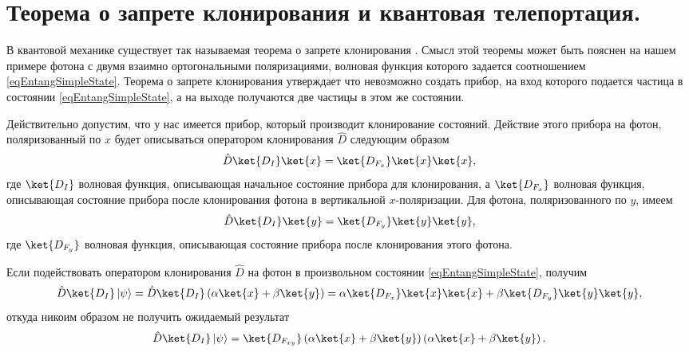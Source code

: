 \section{Теорема о запрете клонирования и квантовая телепортация.}
\label{pPart3EntangleNoClone}
В квантовой механике существует так называемая теорема о запрете
клонирования \cite{bNoClone}. Смысл этой теоремы может быть пояснен на
нашем примере фотона с двумя 
взаимно ортогональными поляризациями, волновая функция которого
задается соотношением \eqref{eqEntangSimpleState}. Теорема о запрете
клонирования  утверждает что невозможно создать прибор, на вход
которого подается частица в состоянии \eqref{eqEntangSimpleState}, 
а на выходе получаются две частицы в этом же состоянии. 

Действительно допустим, что у нас имеется прибор, который производит
клонирование состояний. Действие этого прибора на фотон, поляризованный
по $x$ будет описываться оператором клонирования $\hat{D}$
следующим образом 
\begin{equation}
  \hat{D} \ket{D_I}\ket{x} = \ket{D_{F_x}}\ket{x}\ket{x},
  \nonumber
\end{equation}
где $\ket{D_I}$ волновая функция, описывающая начальное
состояние прибора для клонирования, а  $\ket{D_{F_x}}$ волновая
функция, описывающая состояние прибора после клонирования фотона  
в вертикальной $x$-поляризации. Для фотона, поляризованного по $y$, имеем
\begin{equation}
  \hat{D} \ket{D_I}\ket{y} = \ket{D_{F_y}}\ket{y}\ket{y},
  \nonumber
\end{equation}
где $\ket{D_{F_y}}$ волновая функция, описывающая состояние
прибора после клонирования этого фотона. 

Если подействовать оператором клонирования $\hat{D}$ на фотон в
произвольном состоянии \eqref{eqEntangSimpleState}, получим 
\begin{equation}
  \hat{D} \ket{D_I}\left|\psi\right> = 
  \hat{D} \ket{D_I} \left(\alpha \ket{x} +
  \beta \ket{y}\right) = 
  \alpha \ket{D_{F_x}}\ket{x}\ket{x} +
  \beta \ket{D_{F_y}}\ket{y}\ket{y},
  \nonumber
\end{equation}
откуда никоим образом не получить ожидаемый результат
\begin{equation}
  \hat{D} \ket{D_I}\left|\psi\right> = 
  \ket{D_{F_{xy}}}  \left(\alpha \ket{x} +
  \beta \ket{y}\right)
  \left(\alpha \ket{x} +
  \beta \ket{y}\right).
  \nonumber
\end{equation}

